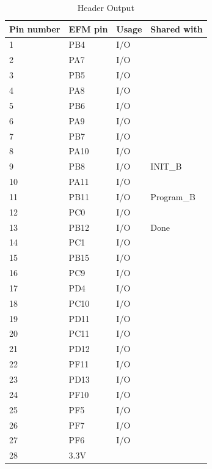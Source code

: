 \begin{table}[]
    \centering
    \begin{tabular}{llll}
        Pin number & EFM pin & Usage & Shared with \\
        \hline
        1       & PB4     & I/O   &             \\
        2       & PA7     & I/O   &             \\
        3       & PB5     & I/O   &             \\
        4       & PA8     & I/O   &             \\
        5       & PB6     & I/O   &             \\
        6       & PA9     & I/O   &             \\
        7       & PB7     & I/O   &             \\
        8       & PA10    & I/O   &             \\
        9       & PB8     & I/O   & INIT\_B     \\
        10      & PA11    & I/O   &             \\
        11      & PB11    & I/O   & Program\_B  \\
        12      & PC0     & I/O   &             \\
        13      & PB12    & I/O   & Done        \\
        14      & PC1     & I/O   &             \\
        15      & PB15    & I/O   &             \\
        16      & PC9     & I/O   &             \\
        17      & PD4     & I/O   &             \\
        18      & PC10    & I/O   &             \\
        19      & PD11    & I/O   &             \\
        20      & PC11    & I/O   &             \\
        21      & PD12    & I/O   &             \\
        22      & PF11    & I/O   &             \\
        23      & PD13    & I/O   &             \\
        24      & PF10    & I/O   &             \\
        25      & PF5     & I/O   &             \\
        26      & PF7     & I/O   &             \\
        27      & PF6     & I/O   &             \\
        28      & 3.3V    &       &
    \end{tabular}
    \caption{Header Output}
    \label{tab:HeaderOut}
\end{table}

